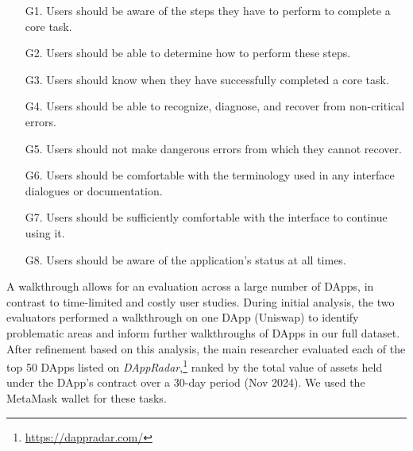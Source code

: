 \documentclass[conference]{IEEEtran}
\begin{document}
\begin{enumerate}
    \item[G1.] Users should be aware of the steps they have to perform to complete a core task.
    \item[G2.] Users should be able to determine how to perform these steps. %
    \item[G3.] Users should know when they have successfully completed a core task. %
    \item[G4.] Users should be able to recognize, diagnose, and recover from non-critical errors. %
    \item[G5.] Users should not make dangerous errors from which they cannot recover. %
    \item[G6.] Users should be comfortable with the terminology used in any interface dialogues or documentation.
    \item[G7.] Users should be sufficiently comfortable with the interface to continue using it.
    \item[G8.] Users should be aware of the application’s status at all times. %
\end{enumerate}

A walkthrough allows for an evaluation across a large number of DApps, in contrast to time-limited and costly user studies. During initial analysis, the two evaluators performed a walkthrough on one DApp (Uniswap) to identify problematic areas and inform further walkthroughs of DApps in our full dataset.
After refinement based on this analysis, the main researcher evaluated each of the top 50 DApps listed on \textit{DAppRadar},\footnote{\url{https://dappradar.com/}} ranked by the total value of assets held under the DApp's contract over a 30-day period (Nov 2024). 
We used the MetaMask wallet for these tasks.
\end{document}
